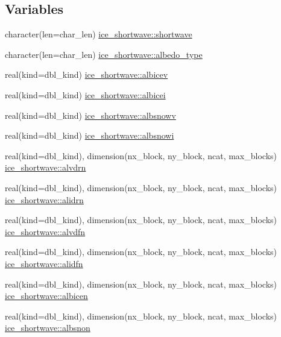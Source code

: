 \subsection*{Variables}
\begin{DoxyCompactItemize}
\item 
character(len=char\_\-len) \hyperlink{namespaceice__shortwave_ab269b293b710b271291a8d83e5994a7e}{ice\_\-shortwave::shortwave}
\item 
character(len=char\_\-len) \hyperlink{namespaceice__shortwave_a9943b1ef08bab4d7a0a1db2b653e0a18}{ice\_\-shortwave::albedo\_\-type}
\item 
real(kind=dbl\_\-kind) \hyperlink{namespaceice__shortwave_a308c9263f113e15d4fe2538423407b71}{ice\_\-shortwave::albicev}
\item 
real(kind=dbl\_\-kind) \hyperlink{namespaceice__shortwave_ac87090b571de74f2625b6fdc46b6be53}{ice\_\-shortwave::albicei}
\item 
real(kind=dbl\_\-kind) \hyperlink{namespaceice__shortwave_a86d6b36a69a220d505725c4696b45acb}{ice\_\-shortwave::albsnowv}
\item 
real(kind=dbl\_\-kind) \hyperlink{namespaceice__shortwave_ae2f840e8aa9cc62828d602e4c8362127}{ice\_\-shortwave::albsnowi}
\item 
real(kind=dbl\_\-kind), dimension(nx\_\-block, ny\_\-block, ncat, max\_\-blocks) \hyperlink{namespaceice__shortwave_a2230448dab2863bca3e1997a89f3412d}{ice\_\-shortwave::alvdrn}
\item 
real(kind=dbl\_\-kind), dimension(nx\_\-block, ny\_\-block, ncat, max\_\-blocks) \hyperlink{namespaceice__shortwave_ad5fc075ea048baae3a2fec2c1cf5233d}{ice\_\-shortwave::alidrn}
\item 
real(kind=dbl\_\-kind), dimension(nx\_\-block, ny\_\-block, ncat, max\_\-blocks) \hyperlink{namespaceice__shortwave_ac6d77b12a1e61fb0b9d1e9639f3ee6ec}{ice\_\-shortwave::alvdfn}
\item 
real(kind=dbl\_\-kind), dimension(nx\_\-block, ny\_\-block, ncat, max\_\-blocks) \hyperlink{namespaceice__shortwave_a8b8421d0ec544285f307d5d10d456e98}{ice\_\-shortwave::alidfn}
\item 
real(kind=dbl\_\-kind), dimension(nx\_\-block, ny\_\-block, ncat, max\_\-blocks) \hyperlink{namespaceice__shortwave_afb40f55204cb60ed558f2d5676051a8e}{ice\_\-shortwave::albicen}
\item 
real(kind=dbl\_\-kind), dimension(nx\_\-block, ny\_\-block, ncat, max\_\-blocks) \hyperlink{namespaceice__shortwave_a1f4c83d80c19fddde454cd208383656e}{ice\_\-shortwave::albsnon}

\end{DoxyCompactItemize}
